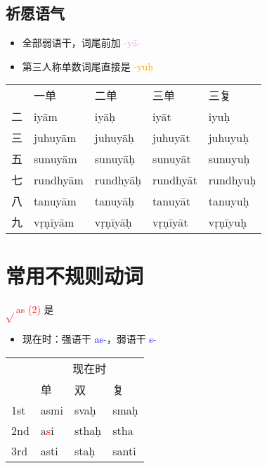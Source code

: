 \documentclass[17pt]{beamer}
\newcommand{\verbroot}[1]{\textcolor{red}{$\sqrt{}$#1}}
\newcommand{\verbstem}[1]{\textcolor{blue}{#1\nobreakdash-}}
\newcommand{\wordending}[1]{\textcolor{Orange}{\nobreakdash-#1}}
\newcommand{\fullpada}[1]{\textcolor{OliveGreen}{#1}}
\newcommand{\pratyaya}[1]{\textcolor{Plum}{#1}}
\begin{document}
\subsection{祈愿语气}
\begin{frame}{\insertsubsection}
  \small
  \begin{itemize}
    \item 全部弱语干，词尾前加 \pratyaya{\nobreakdash-yā-}
    \item 第三人称单数词尾直接是 \wordending{yuḥ}
  \end{itemize}
  \centering
  \begin{tabular}{@{}lllll@{}} %
    & 一单  & 二单 & 三单 & 三复 \\
    二 & \fullpada{iyām} & \fullpada{iyāḥ} & \fullpada{iyāt}  & \fullpada{iyuḥ}  \\
    三 & \fullpada{juhuyām} & \fullpada{juhuyāḥ} & \fullpada{juhuyāt} & \fullpada{juhuyuḥ}  \\
    五 & \fullpada{sunuyām} & \fullpada{sunuyāḥ} & \fullpada{sunuyāt} & \fullpada{sunuyuḥ}  \\
    七 & \fullpada{rundhyām} & \fullpada{rundhyāḥ} & \fullpada{rundhyāt} & \fullpada{rundhyuḥ}  \\
    八 & \fullpada{tanuyām} & \fullpada{tanuyāḥ} & \fullpada{tanuyāt} & \fullpada{tanuyuḥ}  \\
    九 & \fullpada{vṛṇīyām} & \fullpada{vṛṇīyāḥ} & \fullpada{vṛṇīyāt} & \fullpada{vṛṇīyuḥ}  \\
  \end{tabular}   
\end{frame}


\section{常用不规则动词}
\begin{frame}{\insertsection }
    \tableofcontents[currentsection]
\end{frame}

\begin{frame}{\verbroot{as (2)} 是}
  %\small
  \begin{itemize}
    \item 现在时：强语干 \verbstem{as}，弱语干 \verbstem{s}
  \end{itemize}
  \centering
  \begin{tabular}{@{}llll@{}} %
    &   \multicolumn{3}{c}{现在时}  \\
    & 单  & 双 & 复 \\
    1st & \cellcolor{light-gray}\fullpada{asmi} & \fullpada{svaḥ} & \fullpada{smaḥ}  \\
    2nd & \cellcolor{light-gray}\fullpada{a\textcolor{red}{s}i} & \fullpada{sthaḥ} & \fullpada{stha} \\
    3rd & \cellcolor{light-gray}\fullpada{asti} & \fullpada{staḥ} & \fullpada{santi} \\
  \end{tabular}   
\end{frame}
\end{document}
